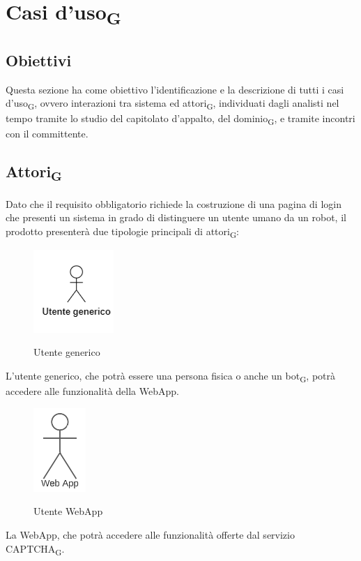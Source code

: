 \section{Casi d'uso\textsubscript{G}}

\subsection{Obiettivi}
Questa sezione ha come obiettivo l'identificazione e la descrizione di tutti i casi d'uso\textsubscript{G}, ovvero interazioni tra sistema ed attori\textsubscript{G}, individuati dagli analisti nel tempo tramite lo studio del capitolato d'appalto, del dominio\textsubscript{G}, e tramite incontri con il committente.

\subsection{Attori\textsubscript{G}}
Dato che il requisito obbligatorio richiede la costruzione di una pagina di login che presenti un sistema in grado di distinguere un utente umano da un robot, il prodotto presenterà due tipologie principali di attori\textsubscript{G}:
\begin{figure}[H]
    \centering
    \includegraphics[scale = 1]{img/utente_generico.png}\\
    \caption{Utente generico}
\end{figure}
L'utente generico, che potrà essere una persona fisica o anche un bot\textsubscript{G}, potrà accedere alle funzionalità della WebApp. \\
\begin{figure}[H]
    \centering
    \includegraphics[scale = 0.8]{img/webapp.png}\\
    \caption{Utente WebApp}
\end{figure}
La WebApp, che potrà accedere alle funzionalità offerte dal servizio CAPTCHA\textsubscript{G}. \\

